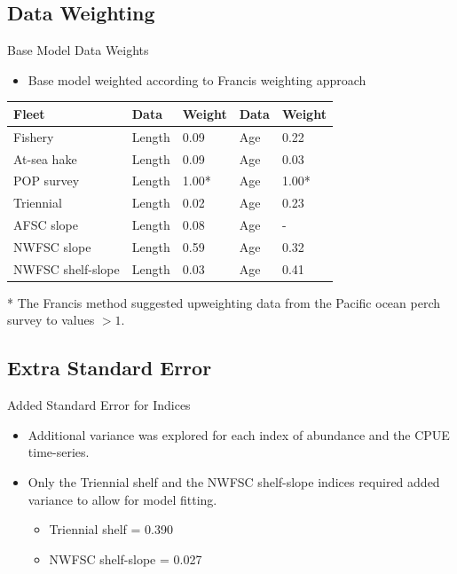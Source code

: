 \documentclass[pdf]{beamer}\usepackage[]{graphicx}\usepackage[]{color}
\begin{document}
\subsection{Data Weighting}
\begin{frame}{Base Model Data Weights}
  \begin{itemize}
    \item Base model weighted according to Francis weighting approach
  \end{itemize}
  
  \begin{table}[ht]
  \small
  \centering
  \begin{tabular}{p{1.2in}p{0.5in}p{0.5in}p{0.5in}p{0.5in}}
  Fleet & Data & Weight & Data & Weight \\ 
  \hline
  Fishery           & Length &  0.09  & Age & 0.22\\
  At-sea hake       & Length &  0.09  & Age & 0.03\\
  POP survey        & Length &  1.00* & Age & 1.00*\\
  Triennial         & Length &  0.02  & Age & 0.23\\
  AFSC slope        & Length &  0.08  & Age &    -\\
  NWFSC slope       & Length &  0.59  & Age & 0.32\\
  NWFSC shelf-slope & Length &  0.03  & Age & 0.41\\
  \hline
  \end{tabular}
  \end{table}
  * The Francis method suggested upweighting data from the Pacific ocean perch survey to values $> 1$. 
\end{frame}



\subsection{Extra Standard Error}
\begin{frame}{Added Standard Error for Indices}
  \begin{itemize}
    \item Additional variance was explored for each index of abundance and the CPUE time-series.
    \item Only the Triennial shelf and the NWFSC shelf-slope indices required added variance to allow for model fitting.
      \begin{itemize}
        \item Triennial shelf = 0.390
        \item NWFSC shelf-slope = 0.027 
      \end{itemize}
  \end{itemize}
\end{frame}
\end{document}
